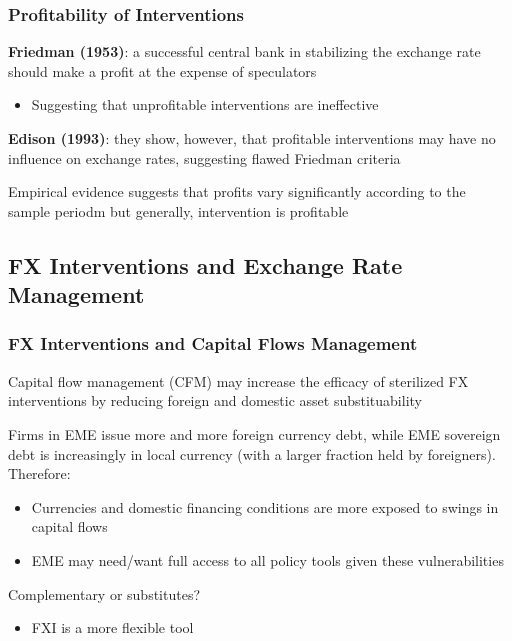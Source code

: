 \documentclass{beamer}
\newenvironment{wideitemize}{\itemize\addtolength{\itemsep}{10pt}}{\enditemize}
\begin{document}
\begin{frame}
  \frametitle{Profitability of Interventions}
  \begin{wideitemize}
  \item \textbf{Friedman (1953)}: a successful central bank in stabilizing the exchange rate should make a profit at the expense of speculators
    \begin{itemize}
    \item Suggesting that unprofitable interventions are ineffective
    \end{itemize}
  \item \textbf{Edison (1993)}: they show, however, that profitable interventions may have no influence on exchange rates, suggesting flawed Friedman criteria
  \item Empirical evidence suggests that profits vary significantly according to the sample periodm but generally, intervention is profitable
  \end{wideitemize}  
\end{frame}


\subsection{FX Interventions and Exchange Rate Management}

\begin{frame}
  \frametitle{FX Interventions and Capital Flows Management}
  \begin{wideitemize}
    \item Capital flow management (CFM) may increase the efficacy of sterilized FX interventions by reducing foreign and domestic asset substituability
    \item Firms in EME issue more and more foreign currency debt, while EME sovereign debt is increasingly in local currency (with a larger fraction held by foreigners). Therefore:
      \begin{itemize}
      \item Currencies and domestic financing conditions are more exposed to swings in capital flows
      \item EME may need/want full access to all policy tools given these vulnerabilities
      \end{itemize}
    \item Complementary or substitutes?
      \begin{itemize}
      \item FXI is a more flexible tool
      \end{itemize}
  \end{wideitemize}
\end{frame}
\end{document}
